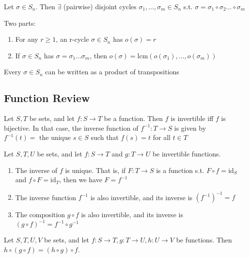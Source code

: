 \thm Let $\sigma \in S_n$. Then $\exists$ (pairwise) disjoint cycles $\sigma_1, \ldots, \sigma_m \in S_n$ s.t. $\sigma = \sigma_1 \circ \sigma_2 \ldots \circ \sigma_m$

\prop Two parts:
\begin{enumerate}
    \item For any $r \ge 1$, an r-cycle $\sigma \in S_n$ has $o(\sigma) = r$
    \item If $\sigma \in S_n$ has $\sigma = \sigma_1 \ldots \sigma_m$, then $o(\sigma) = \text{lcm}(o(\sigma_1), \ldots, o(\sigma_m))$
\end{enumerate}

\thm Every $\sigma \in S_n$ can be written as a product of transpositions

\subsection*{Function Review}
\prop Let $S, T$ be sets, and let $f: S \rightarrow T$ be a function. Then $f$ is invertible iff $f$ is bijective. In that case, the inverse function of $f^{-1}:T \rightarrow S$ is given by $f^{-1}(t) = \text{ the unique } s \in S$ such that $f(s) = t$ for all $t \in T$

\prop Let $S, T, U$ be sets, and let $f: S \rightarrow T$ and $g: T \rightarrow U$ be invertible functions. 
\begin{enumerate}
    \item The inverse of $f$ is unique. That is, if $F: T \rightarrow S$ is a function s.t. $F \circ f = \text{id}_S$ and $f \circ F = \text{id}_T$, then we have $F = f^{-1}$
    \item The inverse function $f^{-1}$ is also invertible, and its inverse is $(f^{-1})^{-1} = f$
    \item The composition $g \circ f$ is also invertible, and its inverse is $(g \circ f)^{-1} = f^{-1} \circ g^{-1}$
\end{enumerate}

\prop Let $S, T, U, V$ be sets, and let $f: S \rightarrow T, g: T \rightarrow U, h: U \rightarrow V$ be functions. Then $h \circ (g \circ f) = (h \circ g) \circ f$.
